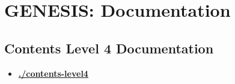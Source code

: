 \documentclass[12pt]{article}
\begin{document}
\section*{GENESIS: Documentation}

\subsection*{Contents Level 4 Documentation}

\begin{itemize}

\item \href{.././contents-level4/./contents-level4.pdf}{\bf \underline{./contents-level4}}


\end{itemize}

\end{document}
